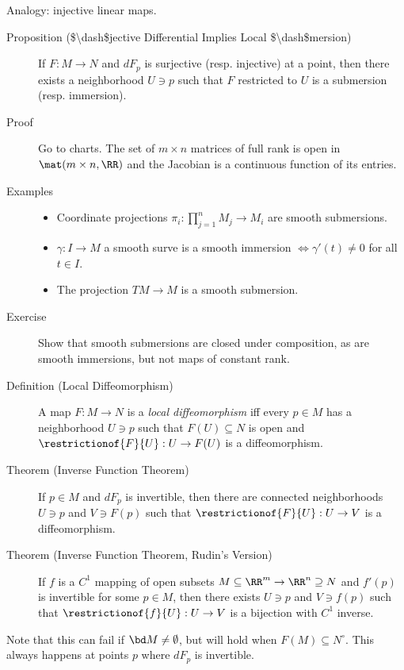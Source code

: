 Analogy: injective linear maps.

\begin{description}
\item[Proposition (\$\textbackslash dash\$jective Differential Implies
Local \$\textbackslash dash\$mersion)]
If \(F:M\to N\) and \(dF_p\) is surjective (resp. injective) at a point,
then there exists a neighborhood \(U \ni p\) such that \(F\) restricted
to \(U\) is a submersion (resp. immersion).
\item[Proof]
Go to charts. The set of \(m\times n\) matrices of full rank is open in
\(\mat(m\times n, \RR)\) and the Jacobian is a continuous function of
its entries.
\item[Examples]
\hfill

\begin{itemize}
\tightlist
\item
  Coordinate projections \(\pi_i: \prod_{j=1}^n M_j \to M_i\) are smooth
  submersions.
\item
  \(\gamma: I \to M\) a smooth surve is a smooth immersion
  \(\iff \gamma'(t) \neq 0\) for all \(t\in I\).
\item
  The projection \(TM\to M\) is a smooth submersion.
\end{itemize}
\item[Exercise]
Show that smooth submersions are closed under composition, as are smooth
immersions, but not maps of constant rank.
\item[Definition (Local Diffeomorphism)]
A map \(F:M\to N\) is a \emph{local diffeomorphism} iff every \(p\in M\)
has a neighborhood \(U\ni p\) such that \(F(U) \subseteq N\) is open and
\(\restrictionof{F}{U}:U\to F(U)\) is a diffeomorphism.
\item[Theorem (Inverse Function Theorem)]
If \(p\in M\) and \(dF_p\) is invertible, then there are connected
neighborhoods \(U\ni p\) and \(V\ni F(p)\) such that
\(\restrictionof{F}{U}:U\to V\) is a diffeomorphism.
\item[Theorem (Inverse Function Theorem, Rudin's Version)]
If \(f\) is a \(C^1\) mapping of open subsets
\(M\subseteq \RR^m\to \RR^n\supseteq N\) and \(f'(p)\) is invertible for
some \(p\in M\), then there exists \(U\ni p\) and \(V\ni f(p)\) such
that \(\restrictionof{f}{U}:U\to V\) is a bijection with \(C^1\)
inverse.
\end{description}

Note that this can fail if \(\bd M \neq \emptyset\), but will hold when
\(F(M)\subseteq N^\circ\). This always happens at points \(p\) where
\(dF_p\) is invertible.


